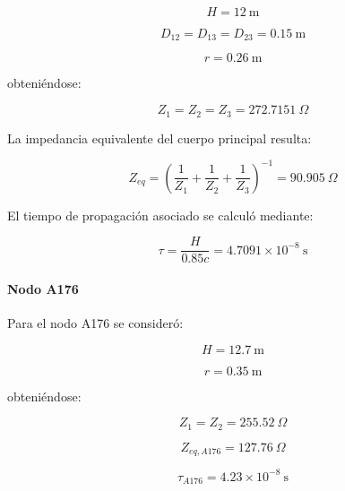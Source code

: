 \documentclass[12pt,letterpaper]{article}
\begin{document}
\begin{equation*}
H=12\ \mathrm{m}
\end{equation*}

\begin{equation*}
D_{12}=D_{13}=D_{23}=0.15\ \mathrm{m}
\end{equation*}

\begin{equation*}
r=0.26\ \mathrm{m}
\end{equation*}

obteniéndose:

\begin{equation*}
Z_1=Z_2=Z_3=272.7151\ \Omega
\end{equation*}

La impedancia equivalente del cuerpo principal resulta:

\begin{equation*}
Z_{eq}
=
\left(
\frac{1}{Z_1}
+
\frac{1}{Z_2}
+
\frac{1}{Z_3}
\right)^{-1}
=
90.905\ \Omega
\end{equation*}

El tiempo de propagación asociado se calculó mediante:

\begin{equation*}
\tau=
\frac{H}{0.85c}
=4.7091\times10^{-8}\ \mathrm{s}
\end{equation*}
\paragraph{Nodo A176}

Para el nodo A176 se consideró:

\begin{equation*}
H=12.7\ \mathrm{m}
\end{equation*}

\begin{equation*}
r=0.35\ \mathrm{m}
\end{equation*}

obteniéndose:

\begin{equation*}
Z_1=Z_2=255.52\ \Omega
\end{equation*}

\begin{equation*}
Z_{eq,A176}
=127.76\ \Omega
\end{equation*}

\begin{equation*}
\tau_{A176} =4.23\times10^{-8}\ \mathrm{s}
\end{equation*}
\end{document}
